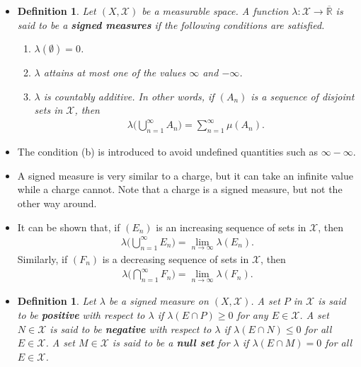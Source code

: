 \documentclass[10pt]{article}
\newtheorem{definition}[lemma]{Definition}
\newcommand{\mcal}[1]{\mathcal{#1}}
\newcommand{\Real}{\mathbb{R}}
\begin{document}
\begin{itemize}
  \item \begin{definition}
    Let $(X,\mcal{X})$ be a measurable space. A function $\lambda: \mcal{X} \rightarrow \overline{\Real}$ is said to be a {\bf signed measures} if the following conditions are satisfied.
    \begin{enumerate}
      \item[(a)] $\lambda(\emptyset) = 0$.
      \item[(b)] $\lambda$ attains at most one of the values $\infty$ and $-\infty$.
      \item[(c)] $\lambda$ is countably additive. In other words, if $(A_n)$ is a sequence of disjoint sets in $\mcal{X}$, then
      \begin{align*}
        \lambda\bigg( \bigcup_{n=1}^\infty A_n \bigg) = \sum_{n=1}^\infty \mu(A_n).
      \end{align*}
    \end{enumerate}
  \end{definition}

  \item The condition (b) is introduced to avoid undefined quantities such as $\infty - \infty$.

  \item A signed measure is very similar to a charge, but it can take an infinite value while a charge cannot. Note that a charge is a signed measure, but not the other way around.
    
  \item It can be shown that, if $(E_n)$ is an increasing sequence of sets in $\mcal{X}$, then
  \begin{align*}
    \lambda\bigg( \bigcup_{n=1}^\infty E_n \bigg) = \lim_{n \rightarrow \infty} \lambda(E_n).
  \end{align*}
  Similarly, if $(F_n)$ is a decreasing sequence of sets in $\mcal{X}$, then
  \begin{align*}
    \lambda\bigg( \bigcap_{n=1}^\infty F_n \bigg) = \lim_{n \rightarrow \infty} \lambda(F_n).
  \end{align*}

  \item \begin{definition}
    Let $\lambda$ be a signed measure on $(X,\mcal{X})$. A set $P$ in $\mcal{X}$ is said to be {\bf positive} with respect to $\lambda$ if $\lambda(E \cap P) \geq 0$ for any $E \in \mcal{X}$. A set $N \in \mcal{X}$ is said to be {\bf negative} with respect to $\lambda$ if $\lambda(E \cap N) \leq 0$ for all $E \in \mcal{X}$. A set $M \in \mcal{X}$ is said to be a {\bf null set} for $\lambda$ if $\lambda(E \cap M) = 0$ for all $E \in \mcal{X}$.
  \end{definition}


\end{itemize}
\end{document}
